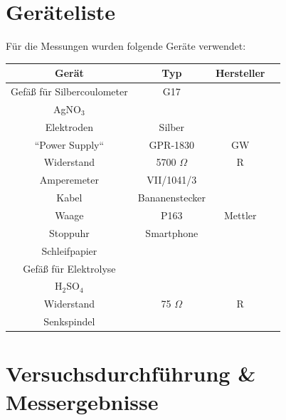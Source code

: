 \documentclass[11pt,ngerman]{scrartcl}
\begin{document}
\newpage

\section{Geräteliste}

\noindent Für die Messungen wurden folgende Geräte verwendet:

\begin{center}
	\begin{tabular}{|c|c|c|c|} \hline
		\textbf{Gerät}             & \textbf{Typ}   & \textbf{Hersteller} \\ \hline

		Gefäß für Silbercoulometer & G17            &                     \\ \hline
		AgNO$_3$                   &                &                     \\ \hline
		Elektroden                 & Silber         &                     \\ \hline
		``Power Supply``           & GPR-1830       & GW                  \\ \hline
		Widerstand                 & 5700 $\Omega$  & R                   \\ \hline
		Amperemeter                & VII/1041/3     &                     \\ \hline
		Kabel                      & Bananenstecker &                     \\ \hline
		Waage                      & P163           & Mettler             \\ \hline
		Stoppuhr                   & Smartphone     &                     \\ \hline
		Schleifpapier              &                &                     \\ \hline
		Gefäß für Elektrolyse      &                &                     \\ \hline
		H$_2$SO$_4$                &                &                     \\ \hline
		Widerstand                 & 75 $\Omega$    & R                   \\ \hline
		Senkspindel                &                &                     \\ \hline
	\end{tabular}
\end{center}


\section{Versuchsdurchführung \& Messergebnisse}\label{sec:Versuchsdurchführung}
\end{document}

